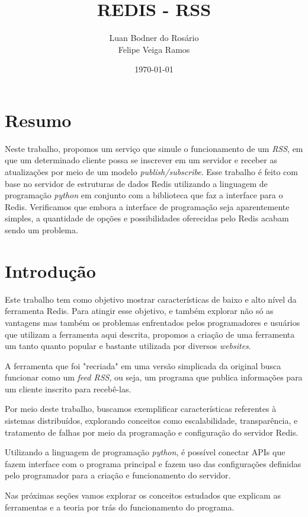 \documentclass[10pt]{IEEEtran}
\title{REDIS - RSS}
\author{Luan Bodner do Rosário \\ Felipe Veiga Ramos}
\date{\today}
\begin{document}
\maketitle

\section{Resumo}

Neste trabalho, propomos um serviço que simule o funcionamento de um \textit{RSS}, em que um determinado cliente possa se inscrever em um servidor e receber as atualizações por meio de um modelo \textit{publish/subscribe}. Esse trabalho é feito com base no servidor de estruturas de dados Redis utilizando a linguagem de programação \textit{python} em conjunto com a biblioteca que faz a interface para o Redis. Verificamos que embora a interface de programação seja aparentemente simples, a quantidade de opções e possibilidades oferecidas pelo Redis acabam sendo um problema.

\section{Introdução}
Este trabalho tem como objetivo mostrar características de baixo e alto nível da ferramenta Redis. Para atingir esse objetivo, e também explorar não só as vantagens mas também os problemas enfrentados pelos programadores e usuários que utilizam a ferramenta aqui descrita, propomos a criação de uma ferramenta um tanto quanto popular e bastante utilizada por diversos \textit{websites}.

A ferramenta que foi "recriada" em uma versão simplicada da original busca funcionar como um \textit{feed RSS}, ou seja, um programa que publica informações para um cliente inscrito para recebê-las.

Por meio deste trabalho, buscamos exemplificar características referentes à sistemas distribuídos, explorando conceitos como escalabilidade, transparência, e tratamento de falhas por meio da programação e configuração do servidor Redis.

Utilizando a linguagem de programação \textit{python}, é possível conectar APIs que fazem interface com o programa principal e fazem uso das configurações definidas pelo programador para a criação e funcionamento do servidor.

Nas próximas seções vamos explorar os conceitos estudados que explicam as ferramentas e a teoria por trás do funcionamento do programa. 
\end{document}
